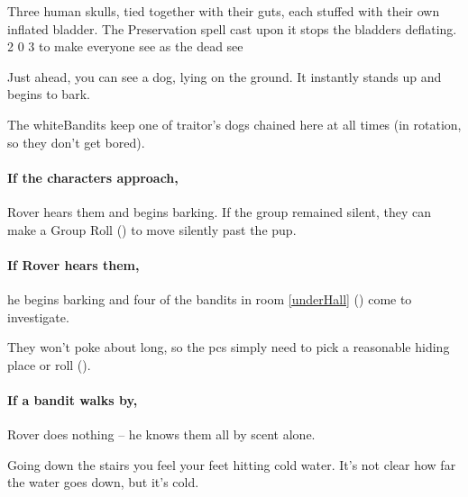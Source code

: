   {Three human skulls, tied together with their guts, each stuffed with their own inflated bladder.
  The Preservation spell cast upon it stops the bladders deflating.}%
  {2}%
  {0}%
  {3}%
  {to make everyone see as the dead see}%
  {
    \setcounter{Fate}{2}
    \setcounter{Air}{2}
    \setcounter{Water}{1}
    \setcounter{Vigilance}{1}
    \setcounter{Academics}{1}
  }%


\begin{boxtext}
  Just ahead, you can see a dog, lying on the ground.
  It instantly stands up and begins to bark.
\end{boxtext}


\begin{exampletext}
  The \gls{whiteBandits} keep one of \gls{traitor}'s dogs chained here at all times (in rotation, so they don't get bored).
\end{exampletext}

\paragraph{If the characters approach,}
Rover hears them and begins barking.
If the group remained silent, they can make a  Group Roll (\tn[9]) to move silently past the pup.

\paragraph{If Rover hears them,}
he begins barking and four of the bandits in room \ref{underHall} () come to investigate.

They won't poke about long, so the \glspl{pc} simply need to pick a reasonable hiding place or roll  (\tn[8]).

\paragraph{If a bandit walks by,}
Rover does nothing -- he knows them all by scent alone.


\begin{boxtext}
  Going down the stairs you feel your feet hitting cold water.
  It's not clear how far the water goes down, but it's cold.
\end{boxtext}

